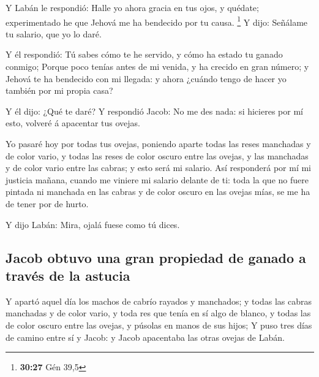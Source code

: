  Y Labán le respondió: Halle yo ahora gracia en tus ojos,
y quédate; experimentado he que Jehová me ha bendecido por tu causa.
\footnote{\textbf{30:27} Gén 39,5}  Y dijo: Señálame tu
salario, que yo lo daré.

 Y él respondió: Tú sabes cómo te he servido, y cómo ha
estado tu ganado conmigo;  Porque poco tenías antes de mi
venida, y ha crecido en gran número; y Jehová te ha bendecido con mi
llegada: y ahora ¿cuándo tengo de hacer yo también por mi propia casa?

 Y él dijo: ¿Qué te daré? Y respondió Jacob: No me des
nada: si hicieres por mí esto, volveré á apacentar tus ovejas.

 Yo pasaré hoy por todas tus ovejas, poniendo aparte
todas las reses manchadas y de color vario, y todas las reses de color
oscuro entre las ovejas, y las manchadas y de color vario entre las
cabras; y esto será mi salario.  Así responderá por mí mi
justicia mañana, cuando me viniere mi salario delante de ti: toda la que
no fuere pintada ni manchada en las cabras y de color oscuro en las
ovejas mías, se me ha de tener por de hurto.

 Y dijo Labán: Mira, ojalá fuese como tú dices.

\hypertarget{jacob-obtuvo-una-gran-propiedad-de-ganado-a-travuxe9s-de-la-astucia}{%
\subsection{Jacob obtuvo una gran propiedad de ganado a través de la
astucia}\label{jacob-obtuvo-una-gran-propiedad-de-ganado-a-travuxe9s-de-la-astucia}}

 Y apartó aquel día los machos de cabrío rayados y
manchados; y todas las cabras manchadas y de color vario, y toda res que
tenía en sí algo de blanco, y todas las de color oscuro entre las
ovejas, y púsolas en manos de sus hijos;  Y puso tres
días de camino entre sí y Jacob: y Jacob apacentaba las otras ovejas de
Labán.

